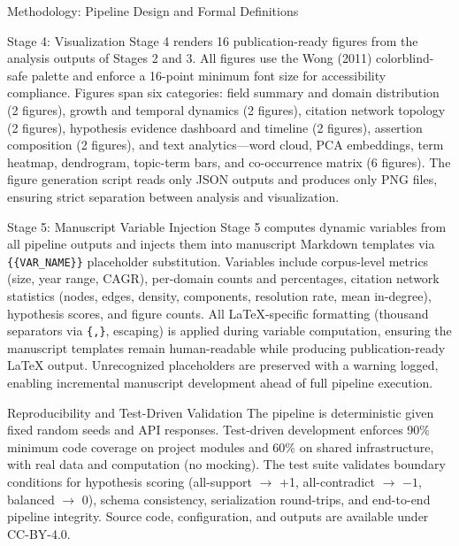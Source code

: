 \documentclass[
  ignorenonframetext,
]{beamer}
\begin{document}
\begin{frame}[fragile]{Methodology: Pipeline Design and Formal
Definitions}
\begin{block}{Stage 4: Visualization}
\protect{}\label{stage-4-visualization}
Stage 4 renders 16 publication-ready figures from the analysis outputs
of Stages 2 and 3. All figures use the Wong (2011) colorblind-safe
palette \citep{wong2011colorblind} and enforce a 16-point minimum font
size for accessibility compliance. Figures span six categories: field
summary and domain distribution (2 figures), growth and temporal
dynamics (2 figures), citation network topology (2 figures), hypothesis
evidence dashboard and timeline (2 figures), assertion composition (2
figures), and text analytics---word cloud, PCA embeddings, term heatmap,
dendrogram, topic-term bars, and co-occurrence matrix (6 figures). The
figure generation script reads only JSON outputs and produces only PNG
files, ensuring strict separation between analysis and visualization.
\end{block}

\begin{block}{Stage 5: Manuscript Variable Injection}
\protect{}\label{stage-5-manuscript-variable-injection}
Stage 5 computes dynamic variables from all pipeline outputs and injects
them into manuscript Markdown templates via \texttt{\{\{VAR\_NAME\}\}}
placeholder substitution. Variables include corpus-level metrics (size,
year range, CAGR), per-domain counts and percentages, citation network
statistics (nodes, edges, density, components, resolution rate, mean
in-degree), hypothesis scores, and figure counts. All LaTeX-specific
formatting (thousand separators via \texttt{\{,\}}, escaping) is applied
during variable computation, ensuring the manuscript templates remain
human-readable while producing publication-ready LaTeX output.
Unrecognized placeholders are preserved with a warning logged, enabling
incremental manuscript development ahead of full pipeline execution.
\end{block}

\begin{block}{Reproducibility and Test-Driven Validation}
\protect{}\label{reproducibility-and-test-driven-validation}
The pipeline is deterministic given fixed random seeds and API
responses. Test-driven development enforces 90\% minimum code coverage
on project modules and 60\% on shared infrastructure, with real data and
computation (no mocking). The test suite validates boundary conditions
for hypothesis scoring (all-support \(\to\) +1, all-contradict \(\to\)
\(-1\), balanced \(\to\) 0), schema consistency, serialization
round-trips, and end-to-end pipeline integrity. Source code,
configuration, and outputs are available under CC-BY-4.0.
\end{block}
\end{frame}
\end{document}
